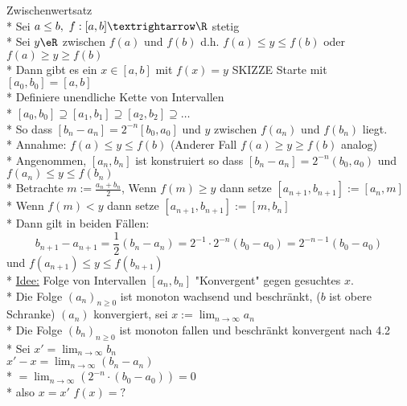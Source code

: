 %
\wdh
Zwischenwertsatz\\*
Sei $a\leq b,\ f:[a,b]→\R$ stetig\\*
Sei $y\eR$ zwischen $f(a)$ und $f(b)$ d.h. $f(a)\leq y\leq f(b)$ oder $f(a)\geq y\geq f(b)$\\*
Dann gibt es ein $x\in[a,b]$ mit $f(x)=y$ SKIZZE
Starte mit $[a_0,b_0]=[a,b]$\\*
Definiere unendliche Kette von Intervallen\\*
$[a_0,b_0]\supseteq [a_1,b_1]\supseteq [a_2,b_2]\supseteq …$\\*
So dass $[b_n-a_n]=2^{-n}[b_0,a_0]$ und $y$ zwischen $f(a_n)$ und $f(b_n)$ liegt.\\*
Annahme: $f(a)\leq y\leq f(b)$ (Anderer Fall $f(a)\geq y\geq f(b)$ analog)\\*
Angenommen, $[a_n,b_n]$ ist konstruiert so dass $[b_n-a_n]=2^{-n}(b_0,a_0)$ und $f(a_n)\leq y\leq f(b_n)$\\*
Betrachte $m:=\frac{a_n+b_n}{2}$, Wenn $f(m)\geq y$ dann setze $[a_{n+1},b_{n+1}]:=[a_n,m]$\\*
Wenn $f(m)<y$ dann setze $[a_{n+1},b_{n+1}]:=[m,b_n]$\\*
Dann gilt in beiden Fällen:
$$b_{n+1}-a_{n+1}=\frac{1}{2}(b_n-a_n)=2^{-1}·2^{-n}(b_0-a_0)=2^{-n-1}(b_0-a_0)$$
und $f(a_{n+1})\leq y\leq f(b_{n+1})$\\*
%
\ul{Idee:} Folge von Intervallen $[a_n, b_n]$ "Konvergent" gegen gesuchtes $x$.\\*
	Die Folge $(a_n)_{n \geq 0}$ ist monoton wachsend und beschränkt, ($b$ ist obere Schranke) \Rarr $(a_n)$ konvergiert, sei $x:=\lim_{n \to \infty} a_n$\\*
	Die Folge $(b_n)_{n \geq 0}$ ist monoton fallen und beschränkt \Rarr konvergent nach 4.2\\*
	Sei $x' = \lim_{n \to \infty} b_n$\\
	$x' - x = \lim_{n \to \infty} (b_n - a_n)$\\*
	$= \lim_{n \to \infty} (2^{-n} \cdot (b_0 - a_0)) = 0$\\*
	also $x = x'$ $f(x) = ?$\\
